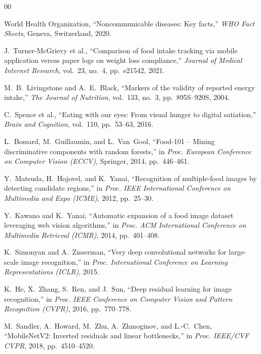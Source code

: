 \documentclass[10pt,journal,compsoc]{IEEEtran}
\begin{document}
\begin{thebibliography}{00}

World Health Organization, ``Noncommunicable diseases: Key facts,'' \emph{WHO Fact Sheets}, Geneva, Switzerland, 2020.

J.~Turner-McGrievy et al., ``Comparison of food intake tracking via mobile application versus paper logs on weight loss compliance,'' \emph{Journal of Medical Internet Research}, vol.~23, no.~4, pp.~e21542, 2021.

M.~B.~Livingstone and A.~E.~Black, ``Markers of the validity of reported energy intake,'' \emph{The Journal of Nutrition}, vol.~133, no.~3, pp.~895S--920S, 2004.

C.~Spence et al., ``Eating with our eyes: From visual hunger to digital satiation,'' \emph{Brain and Cognition}, vol.~110, pp.~53--63, 2016.

L.~Bossard, M.~Guillaumin, and L.~Van~Gool, ``Food-101 -- Mining discriminative components with random forests,'' in \emph{Proc. European Conference on Computer Vision (ECCV)}, Springer, 2014, pp.~446--461.

Y.~Matsuda, H.~Hojovel, and K.~Yanai, ``Recognition of multiple-food images by detecting candidate regions,'' in \emph{Proc. IEEE International Conference on Multimedia and Expo (ICME)}, 2012, pp.~25--30.

Y.~Kawano and K.~Yanai, ``Automatic expansion of a food image dataset leveraging web vision algorithms,'' in \emph{Proc. ACM International Conference on Multimedia Retrieval (ICMR)}, 2014, pp.~401--408.

K.~Simonyan and A.~Zisserman, ``Very deep convolutional networks for large-scale image recognition,'' in \emph{Proc. International Conference on Learning Representations (ICLR)}, 2015.

K.~He, X.~Zhang, S.~Ren, and J.~Sun, ``Deep residual learning for image recognition,'' in \emph{Proc. IEEE Conference on Computer Vision and Pattern Recognition (CVPR)}, 2016, pp.~770--778.

M.~Sandler, A.~Howard, M.~Zhu, A.~Zhmoginov, and L.-C.~Chen, ``MobileNetV2: Inverted residuals and linear bottlenecks,'' in \emph{Proc. IEEE/CVF CVPR}, 2018, pp.~4510--4520.


\end{thebibliography}
\end{document}
